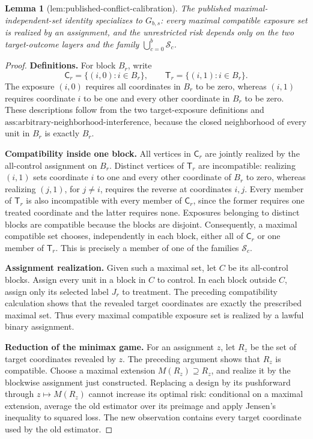 \documentclass{article}
\newtheorem{lemma}{Lemma}
\begin{document}
\begin{lemma}[lem:published-conflict-calibration]\label{lem:published-conflict-calibration}
The published maximal-independent-set identity specializes to \(G_{b,s}\): every maximal compatible exposure set is realized by an assignment, and the unrestricted risk depends only on the two target-outcome layers and the family \(\bigcup_{c=0}^b\mathcal S_c\).
\end{lemma}
\begin{proof}
\textbf{Definitions.} For block \(B_r\), write
\[
\mathsf C_r=\{(i,0):i\in B_r\},
\qquad
\mathsf T_r=\{(i,1):i\in B_r\}.
\]
The exposure \((i,0)\) requires all coordinates in \(B_r\) to be zero, whereas \((i,1)\) requires coordinate \(i\) to be one and every other coordinate in \(B_r\) to be zero. These descriptions follow from the two target-exposure definitions and \(\text{ass:arbitrary-neighborhood-interference}\), because the closed neighborhood of every unit in \(B_r\) is exactly \(B_r\).

\textbf{Compatibility inside one block.} All vertices in \(\mathsf C_r\) are jointly realized by the all-control assignment on \(B_r\). Distinct vertices of \(\mathsf T_r\) are incompatible: realizing \((i,1)\) sets coordinate \(i\) to one and every other coordinate of \(B_r\) to zero, whereas realizing \((j,1)\), for \(j\ne i\), requires the reverse at coordinates \(i,j\). Every member of \(\mathsf T_r\) is also incompatible with every member of \(\mathsf C_r\), since the former requires one treated coordinate and the latter requires none. Exposures belonging to distinct blocks are compatible because the blocks are disjoint. Consequently, a maximal compatible set chooses, independently in each block, either all of \(\mathsf C_r\) or one member of \(\mathsf T_r\). This is precisely a member of one of the families \(\mathcal S_c\).

\textbf{Assignment realization.} Given such a maximal set, let \(C\) be its all-control blocks. Assign every unit in a block in \(C\) to control. In each block outside \(C\), assign only its selected label \(J_r\) to treatment. The preceding compatibility calculation shows that the revealed target coordinates are exactly the prescribed maximal set. Thus every maximal compatible exposure set is realized by a lawful binary assignment.

\textbf{Reduction of the minimax game.} For an assignment \(z\), let \(R_z\) be the set of target coordinates revealed by \(z\). The preceding argument shows that \(R_z\) is compatible. Choose a maximal extension \(M(R_z)\supseteq R_z\), and realize it by the blockwise assignment just constructed. Replacing a design by its pushforward through \(z\mapsto M(R_z)\) cannot increase its optimal risk: conditional on a maximal extension, average the old estimator over its preimage and apply Jensen's inequality to squared loss. The new observation contains every target coordinate used by the old estimator.


\end{proof}
\end{document}
